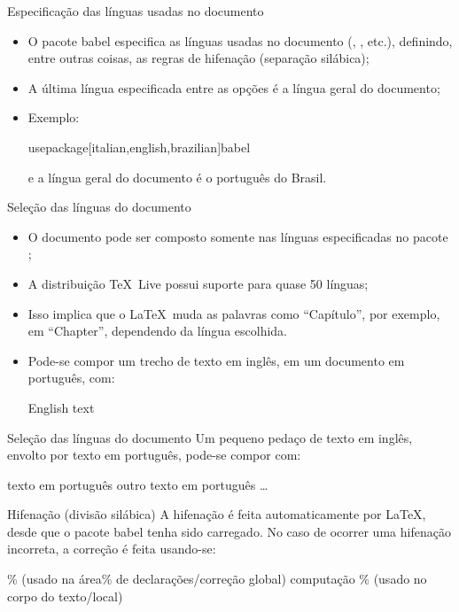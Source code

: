\begin{frame}{Especificação das línguas usadas no documento}
\begin{itemize}
\item O pacote babel especifica as línguas usadas no documento (, , etc.), definindo, entre outras coisas, as regras de hifenação (separação silábica);
\item A última língua especificada entre as opções é a língua geral do documento;
\item Exemplo:
\begin{LaTeXcode}
\LOA usepackage[italian,english,brazilian]{babel}
\end{LaTeXcode}
e a língua geral do documento é o português do Brasil.
\end{itemize}
\end{frame}

\begin{frame}{Seleção das línguas do documento}
\begin{itemize}
\item O documento pode ser composto somente nas línguas especificadas no pacote ; 
\item A distribuição \TeX\ Live possui suporte para quase 50 línguas;
\item Isso implica que o \LaTeX\ muda as palavras como ``Capítulo'', por exemplo, em ``Chapter'', dependendo da língua escolhida.
\item Pode-se compor um trecho de texto em inglês, em um documento em português, com:
\begin{LaTeXcode}
\n
English text\n
{}
\end{LaTeXcode}
\end{itemize}
\end{frame}

\begin{frame}{Seleção das línguas do documento}
Um pequeno pedaço de texto em inglês, envolto por texto em português,  pode-se compor com:
\begin{LaTeXcode}
texto em português 
outro texto em português \dots
\end{LaTeXcode}
\end{frame}

\begin{frame}{Hifenação (divisão silábica)}
A hifenação é feita automaticamente por \LaTeX, desde que o pacote babel tenha sido carregado. No caso de ocorrer uma hifenação incorreta, a correção é feita usando-se:
\begin{LaTeXcode}
 \% (usado na área\n \% de declarações/correção global)\nn
com\LCmd{-}pu\LCmd{-}ta\LCmd{-}ção \% (usado no corpo do texto/local)
\end{LaTeXcode}
\end{frame}

